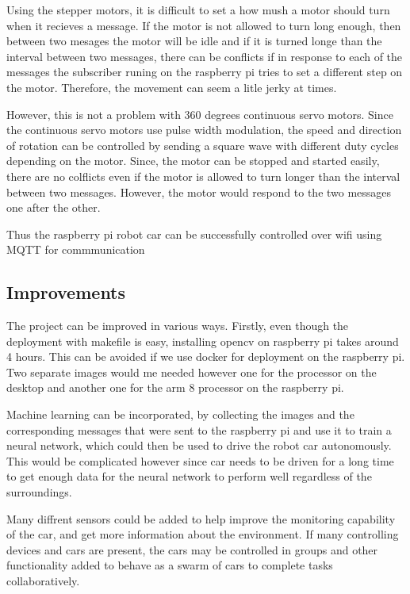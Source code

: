 \documentclass[sigconf]{acmart}
\begin{document}
Using the stepper motors, it is difficult to set a how mush a motor should turn when it recieves a message. If the motor is not allowed to turn long enough, then between two mesages the motor will be idle and if it is turned longe than the interval between two messages, there can be conflicts if in response to each of the messages the subscriber runing on the raspberry pi tries to set a different step on the motor. Therefore, the movement can seem a litle jerky at times.

However, this is not a problem with 360 degrees continuous servo motors. Since the continuous servo motors use pulse width modulation, the speed and direction of rotation can be controlled by sending a square wave with different duty cycles depending on the motor. Since, the motor can be stopped and started easily, there are no colflicts even if the motor is allowed to turn longer than the interval between two messages. However, the motor would respond to the two messages one after the other.

Thus the raspberry pi robot car can be successfully controlled over wifi using MQTT for commmunication

\subsection{Improvements}

The project can be improved in various ways. Firstly, even though the deployment with makefile is easy, installing opencv on raspberry pi takes around 4 hours. This can be avoided if we use docker for deployment on the raspberry pi. Two separate images would me needed however one for the processor on the desktop and another one for the arm 8 processor on the raspberry pi.

Machine learning can be incorporated, by collecting the images and the corresponding messages that were sent to the raspberry pi and use it to train a neural network, which could then be used to drive the robot car autonomously. This would be complicated however since car needs to be driven for a long time to get enough data for the neural network to perform well regardless of the surroundings.

Many diffrent sensors could be added to help improve the monitoring capability of the car, and get more information about the environment.
If many controlling devices and cars are present, the cars may be controlled in groups and other functionality added to behave as a swarm of cars to complete tasks collaboratively.
\end{document}
